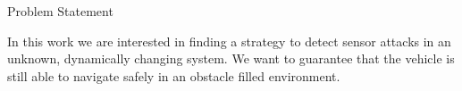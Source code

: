 \begin{section}{Problem Statement}
	
\label{sec:problem}
In this work we are interested in finding a strategy to detect sensor attacks in an unknown, dynamically changing system. We want to guarantee that the vehicle is still able to navigate safely in an obstacle filled environment.%







\end{section}
